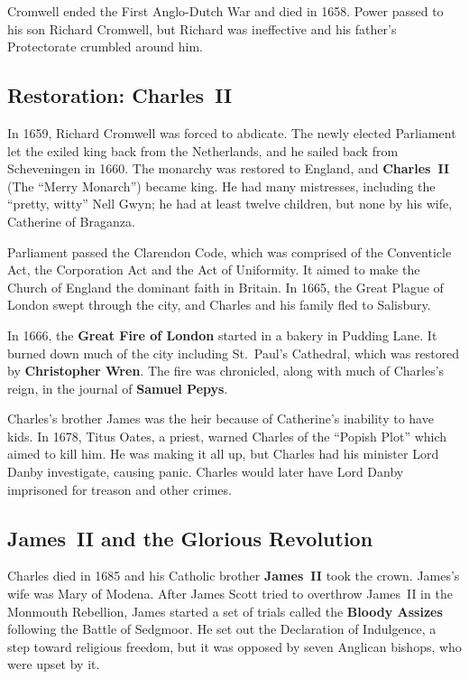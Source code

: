 Cromwell ended the First Anglo-Dutch War and died in 1658.
Power passed to his son Richard Cromwell,
but Richard was ineffective and his father's Protectorate crumbled around him.

\subsection*{Restoration: Charles~II}

In 1659, Richard Cromwell was forced to abdicate.
The newly elected Parliament let the exiled king back from the Netherlands,
and he sailed back from Scheveningen in 1660.
The monarchy was restored to England, and \textbf{Charles~II} (The ``Merry Monarch'') became king.
He had many mistresses, including the ``pretty, witty'' Nell Gwyn;
he had at least twelve children, but none by his wife, Catherine of Braganza.

Parliament passed the Clarendon Code, which was comprised of
the Conventicle Act,
the Corporation Act
and the Act of Uniformity.
It aimed to make the Church of England the dominant faith in Britain.
In 1665, the Great Plague of London swept through the city,
and Charles and his family fled to Salisbury.

In 1666, the \textbf{Great Fire of London} started in a bakery in Pudding Lane.
It burned down much of the city including St.\ Paul's Cathedral, which was restored by \textbf{Christopher Wren}.
The fire was chronicled, along with much of Charles's reign, in the journal of \textbf{Samuel Pepys}.

Charles's brother James was the heir because of Catherine's inability to have kids.
In 1678, Titus Oates, a priest, warned Charles of the ``Popish Plot'' which aimed to kill him.
He was making it all up, but Charles had his minister Lord Danby investigate, causing panic.
Charles would later have Lord Danby imprisoned for treason and other crimes.

\subsection*{James~II and the Glorious Revolution}

Charles died in 1685 and his Catholic brother \textbf{James~II} took the crown.
James's wife was Mary of Modena.
After James Scott tried to overthrow James~II in the Monmouth Rebellion,
James started a set of trials called the \textbf{Bloody Assizes} following the Battle of Sedgmoor.
He set out the Declaration of Indulgence, a step toward religious freedom,
but it was opposed by seven Anglican bishops, who were upset by it.

